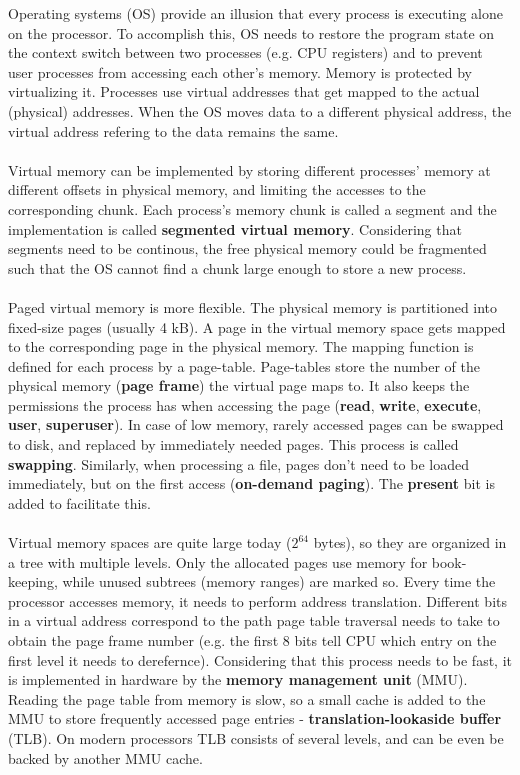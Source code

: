 \documentclass[conference]{IEEEtran}
\begin{document}
Operating systems (OS) provide an illusion that every process is executing alone on the processor. To accomplish this, OS needs to restore the program state on the context switch between two processes (e.g. CPU registers) and to prevent user processes from accessing each other's memory. Memory is protected by virtualizing it. Processes use virtual addresses that get mapped to the actual (physical) addresses. When the OS moves data to a different physical address, the virtual address refering to the data remains the same.
\\
\\
Virtual memory can be implemented by storing different processes' memory at different offsets in physical memory, and limiting the accesses to the corresponding chunk. Each process's memory chunk is called a segment and the implementation is called \textbf{segmented virtual memory}. Considering that segments need to be continous, the free physical memory could be fragmented such that the OS cannot find a chunk large enough to store a new process.
\\
\\
Paged virtual memory is more flexible. The physical memory is partitioned into fixed-size pages (usually 4 kB). A page in the virtual memory space gets mapped to the corresponding page in the physical memory. The mapping function is defined for each process by a page-table. Page-tables store the number of the physical memory (\textbf{page frame}) the virtual page maps to. It also keeps the permissions the process has when accessing the page (\textbf{read}, \textbf{write}, \textbf{execute}, \textbf{user}, \textbf{superuser}). In case of low memory, rarely accessed pages can be swapped to disk, and replaced by immediately needed pages. This process is called \textbf{swapping}. Similarly, when processing a file, pages don't need to be loaded immediately, but on the first access (\textbf{on-demand paging}). The \textbf{present} bit is added to facilitate this.
\\
\\
Virtual memory spaces are quite large today ($2^{64}$ bytes), so they are organized in a tree with multiple levels. Only the allocated pages use memory for book-keeping, while unused subtrees (memory ranges) are marked so. Every time the processor accesses memory, it needs to perform address translation. Different bits in a virtual address correspond to the path page table traversal needs to take to obtain the page frame number (e.g. the first 8 bits tell CPU which entry on the first level it needs to derefernce). Considering that this process needs to be fast, it is implemented in hardware by the \textbf{memory management unit} (MMU). Reading the page table from memory is slow, so a small cache is added to the MMU to store frequently accessed page entries - \textbf{translation-lookaside buffer} (TLB). On modern processors TLB consists of several levels, and can be even be backed by another MMU cache. 
\end{document}
